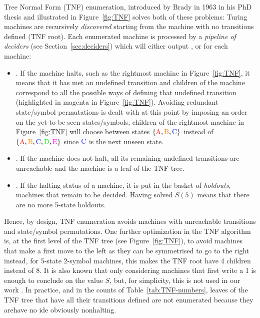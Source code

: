 Tree Normal Form (TNF) enumeration, introduced by Brady in 1963 in his PhD thesis \cite{Brady64} and illustrated in Figure~\ref{fig:TNF} solves both of these problems: Turing machines are recursively \textit{discovered} starting from the machine with no transitions defined (TNF root). Each enumerated machine is processed by a \textit{pipeline of deciders} (see Section~\ref{sec:deciders}) which will either output \HALT, \NONHALT or \UNKNOWN for each machine:
\begin{itemize}
    \item \HALT. If the machine halts, such as the rightmost machine in Figure~\ref{fig:TNF}, it means that it has met an undefined transition and children of the machine correspond to all the possible ways of defining that undefined transition (highlighted in magenta in Figure~\ref{fig:TNF}). Avoiding redundant state/symbol permutations is dealt with at this point by imposing an order on the yet-to-be-seen states/symbols, \eg children of the rightmost machine in Figure~\ref{fig:TNF} will choose between states $\{\text{\stateA},\text{\stateB},\text{\stateC}\}$ instead of $\{\text{\stateA},\text{\stateB},\text{\stateC},\text{\stateD},\text{\stateE}\}$ since $\text{\stateC}$ is the next unseen state.

    \item  \NONHALT. If the machine does not halt, all its remaining undefined transitions are unreachable and the machine is a leaf of the TNF tree.
    \item \UNKNOWN. If the halting status of a machine, it is put in the basket of \textit{holdouts}, \ie machines that remain to be decided. Having solved $S(5)$ means that there are no more 5-state holdouts.
\end{itemize}


Hence, by design, TNF enumeration avoids machines with unreachable transitions and state/symbol permutations. One further optimization in the TNF algorithm is,
at the first level of the TNF tree (see Figure~\ref{fig:TNF}), to avoid machines that make a first move to the left as they can be symmetrised to go to the right instead, \eg for 5-state 2-symbol machines, this makes the TNF root have 4 children instead of 8. It is also known that only considering machines that first write a 1 is enough to conclude on the value $S$, but, for simplicity, this is not used in our work \cite{Marxen_1990,busycoq}. In practice, and in the counts of Table~\ref{tab:TNF-numbers}, leaves of the TNF tree that have all their transitions defined are not enumerated because they arehave no ide obviously nonhalting.

